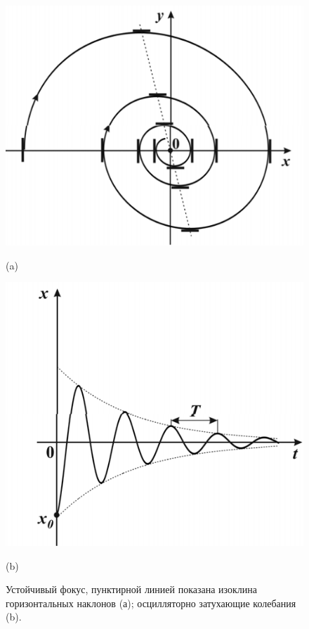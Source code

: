 \begin{figure}[h]
        \centering
        \begin{minipage}{0.45\linewidth}
                \centering  
                \includegraphics[]{fig/lect5/4a}

                (a)
        \end{minipage}
        \begin{minipage}{0.45\linewidth}
                \centering  
                \includegraphics[]{fig/lect5/4b}

                (b)      
        \end{minipage}
        \caption{Устойчивый фокус, пунктирной линией показана изоклина горизонтальных наклонов (а); осцилляторно затухающие колебания (b). }
        \label{fig:5.4}
\end{figure}



